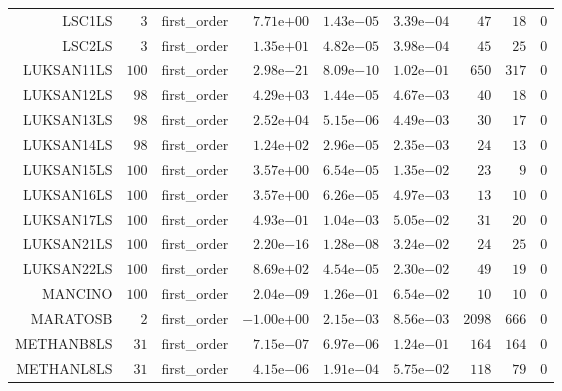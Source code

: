\begin{longtable}{rrrrrrrrr}
LSC1LS & \(     3\) & first\_order & \( 7.71\)e\(+00\) & \( 1.43\)e\(-05\) & \( 3.39\)e\(-04\) & \(    47\) & \(    18\) & \(     0\) \\
LSC2LS & \(     3\) & first\_order & \( 1.35\)e\(+01\) & \( 4.82\)e\(-05\) & \( 3.98\)e\(-04\) & \(    45\) & \(    25\) & \(     0\) \\
LUKSAN11LS & \(   100\) & first\_order & \( 2.98\)e\(-21\) & \( 8.09\)e\(-10\) & \( 1.02\)e\(-01\) & \(   650\) & \(   317\) & \(     0\) \\
LUKSAN12LS & \(    98\) & first\_order & \( 4.29\)e\(+03\) & \( 1.44\)e\(-05\) & \( 4.67\)e\(-03\) & \(    40\) & \(    18\) & \(     0\) \\
LUKSAN13LS & \(    98\) & first\_order & \( 2.52\)e\(+04\) & \( 5.15\)e\(-06\) & \( 4.49\)e\(-03\) & \(    30\) & \(    17\) & \(     0\) \\
LUKSAN14LS & \(    98\) & first\_order & \( 1.24\)e\(+02\) & \( 2.96\)e\(-05\) & \( 2.35\)e\(-03\) & \(    24\) & \(    13\) & \(     0\) \\
LUKSAN15LS & \(   100\) & first\_order & \( 3.57\)e\(+00\) & \( 6.54\)e\(-05\) & \( 1.35\)e\(-02\) & \(    23\) & \(     9\) & \(     0\) \\
LUKSAN16LS & \(   100\) & first\_order & \( 3.57\)e\(+00\) & \( 6.26\)e\(-05\) & \( 4.97\)e\(-03\) & \(    13\) & \(    10\) & \(     0\) \\
LUKSAN17LS & \(   100\) & first\_order & \( 4.93\)e\(-01\) & \( 1.04\)e\(-03\) & \( 5.05\)e\(-02\) & \(    31\) & \(    20\) & \(     0\) \\
LUKSAN21LS & \(   100\) & first\_order & \( 2.20\)e\(-16\) & \( 1.28\)e\(-08\) & \( 3.24\)e\(-02\) & \(    24\) & \(    25\) & \(     0\) \\
LUKSAN22LS & \(   100\) & first\_order & \( 8.69\)e\(+02\) & \( 4.54\)e\(-05\) & \( 2.30\)e\(-02\) & \(    49\) & \(    19\) & \(     0\) \\
MANCINO & \(   100\) & first\_order & \( 2.04\)e\(-09\) & \( 1.26\)e\(-01\) & \( 6.54\)e\(-02\) & \(    10\) & \(    10\) & \(     0\) \\
MARATOSB & \(     2\) & first\_order & \(-1.00\)e\(+00\) & \( 2.15\)e\(-03\) & \( 8.56\)e\(-03\) & \(  2098\) & \(   666\) & \(     0\) \\
METHANB8LS & \(    31\) & first\_order & \( 7.15\)e\(-07\) & \( 6.97\)e\(-06\) & \( 1.24\)e\(-01\) & \(   164\) & \(   164\) & \(     0\) \\
METHANL8LS & \(    31\) & first\_order & \( 4.15\)e\(-06\) & \( 1.91\)e\(-04\) & \( 5.75\)e\(-02\) & \(   118\) & \(    79\) & \(     0\) \\

\end{longtable}
